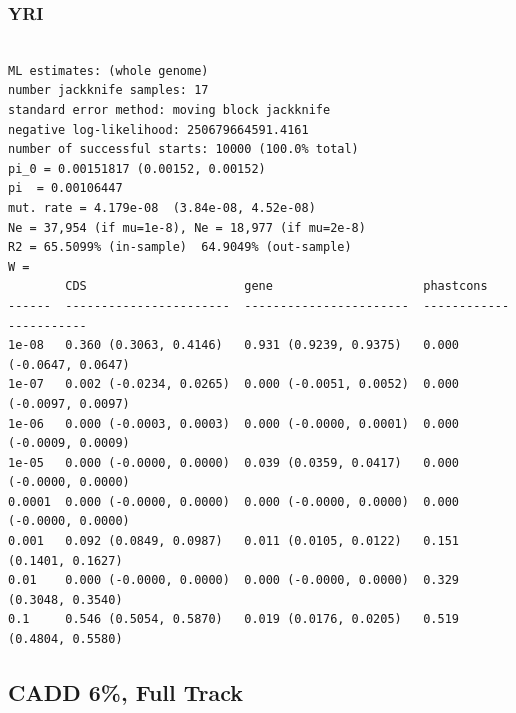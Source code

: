 \documentclass[11pt]{article}
\begin{document}
\subsubsection*{YRI}
\begin{minipage}{\linewidth}\begin{footnotesize}
\begin{verbatim}

ML estimates: (whole genome)
number jackknife samples: 17
standard error method: moving block jackknife
negative log-likelihood: 250679664591.4161
number of successful starts: 10000 (100.0% total)
pi_0 = 0.00151817 (0.00152, 0.00152)
pi  = 0.00106447
mut. rate = 4.179e-08  (3.84e-08, 4.52e-08)
Ne = 37,954 (if mu=1e-8), Ne = 18,977 (if mu=2e-8)
R2 = 65.5099% (in-sample)  64.9049% (out-sample)
W = 
        CDS                      gene                     phastcons
------  -----------------------  -----------------------  -----------------------
1e-08   0.360 (0.3063, 0.4146)   0.931 (0.9239, 0.9375)   0.000 (-0.0647, 0.0647)
1e-07   0.002 (-0.0234, 0.0265)  0.000 (-0.0051, 0.0052)  0.000 (-0.0097, 0.0097)
1e-06   0.000 (-0.0003, 0.0003)  0.000 (-0.0000, 0.0001)  0.000 (-0.0009, 0.0009)
1e-05   0.000 (-0.0000, 0.0000)  0.039 (0.0359, 0.0417)   0.000 (-0.0000, 0.0000)
0.0001  0.000 (-0.0000, 0.0000)  0.000 (-0.0000, 0.0000)  0.000 (-0.0000, 0.0000)
0.001   0.092 (0.0849, 0.0987)   0.011 (0.0105, 0.0122)   0.151 (0.1401, 0.1627)
0.01    0.000 (-0.0000, 0.0000)  0.000 (-0.0000, 0.0000)  0.329 (0.3048, 0.3540)
0.1     0.546 (0.5054, 0.5870)   0.019 (0.0176, 0.0205)   0.519 (0.4804, 0.5580)
\end{verbatim}
\end{footnotesize}\end{minipage}


\subsection{CADD 6\%, Full Track}
\end{document}
